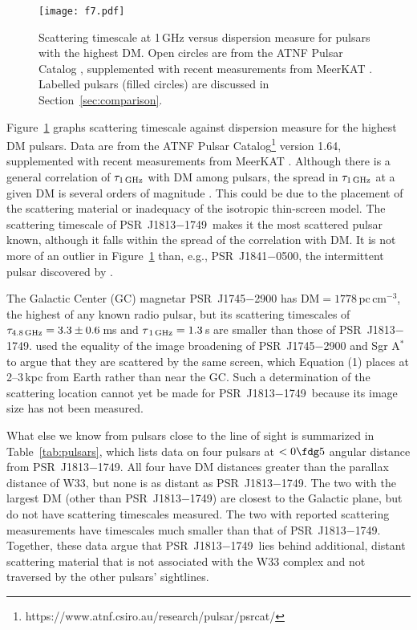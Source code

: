 \documentclass[twocolumn]{aastex62}
\newcommand\psr{PSR~J1813$-$1749}
\begin{document}
\begin{figure}
\centerline{
\texttt{[image: f7.pdf]}
}
\caption{Scattering timescale at 1\,GHz versus dispersion measure
for pulsars with the highest DM.  Open circles are from the ATNF
Pulsar Catalog \citep{man05}, supplemented with recent measurements
from MeerKAT \citep{osw21}. Labelled pulsars (filled circles) are
discussed in Section~\ref{sec:comparison}.
}
\label{fig:fig7}
\end{figure}

Figure~\ref{fig:fig7} graphs scattering timescale against dispersion
measure for the highest DM pulsars.  Data are from the ATNF Pulsar
Catalog\footnote{https://www.atnf.csiro.au/research/pulsar/psrcat/}
\citep{man05} version 1.64, supplemented with recent measurements
from MeerKAT \citep{osw21}.  Although there is a general correlation
of $\tau_{\rm 1\,GHz}$ with DM among pulsars, the spread in $\tau_{\rm
1\,GHz}$ at a given DM is several orders of magnitude \citep{loh01,lew15}.
This could be due to the placement of the scattering material or
inadequacy of the isotropic thin-screen model.  The scattering
timescale of \psr\ makes it the most scattered pulsar known,
although it falls within the spread of the correlation with DM.
It is not more of an outlier in Figure~\ref{fig:fig7} than, e.g.,
PSR~J1841$-$0500, the intermittent pulsar discovered by \citet{cam12}.

The Galactic Center (GC) magnetar PSR~J1745$-$2900 has
$\mbox{DM}=1778$\,pc\,cm$^{-3}$, the highest of any known radio
pulsar, but its scattering timescales of $\tau_{\rm
4.8\,GHz}=3.3\pm0.6$\,ms and $\tau_{\,\rm 1\,GHz}=1.3$\,s \citep{spi14}
are smaller than those of \psr.  \citet{bow14} used the equality
of the image broadening of PSR~J1745$-$2900 and Sgr A$^*$ to argue
that they are scattered by the same screen, which Equation (1)
places at 2--3\,kpc from Earth rather than near the GC.  Such a
determination of the scattering location cannot yet be made for
\psr\ because its image size has not been measured.

What else we know from pulsars close to the line of sight is
summarized in Table~\ref{tab:pulsars}, which lists data on four
pulsars at $<0\fdg5$ angular distance from \psr.  All four have DM
distances greater than the parallax distance of W33, but none is
as distant as \psr.  The two with the largest DM (other than \psr)
are closest to the Galactic plane, but do not have scattering
timescales measured.  The two with reported scattering measurements
have timescales much smaller than that of \psr.  Together, these
data argue that \psr\ lies behind additional, distant scattering
material that is not associated with the W33 complex and not traversed
by the other pulsars' sightlines.
\end{document}
